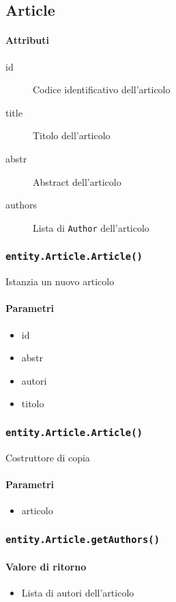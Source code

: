 \subsection{Article}
\paragraph{Attributi}
\begin{description}
\item[id] Codice identificativo dell'articolo
\item[title] Titolo dell'articolo
\item[abstr]  Abstract dell'articolo
\item[authors] Lista di \texttt{Author} dell'articolo
\end{description}

\subsubsection{\texttt{entity.Article.Article()}}
Istanzia un nuovo articolo
\paragraph{Parametri}
\begin{itemize}
\item id
\item abstr
\item autori
\item titolo
\end{itemize}

\subsubsection{\texttt{entity.Article.Article()}}
Costruttore di copia
\paragraph{Parametri}
\begin{itemize}
\item articolo
\end{itemize}

\subsubsection{\texttt{entity.Article.getAuthors()}}
\paragraph{Valore di ritorno}
\begin{itemize}
\item Lista di autori dell'articolo
\end{itemize}

